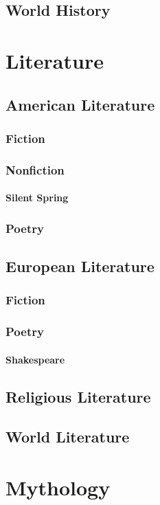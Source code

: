 \documentclass[12pt]{book}
\begin{document}
	\section{World History}
	
	
	
\chapter{Literature}
	\section{American Literature}
		\subsection{Fiction}
		\subsection{Nonfiction}
			\subsubsection{Silent Spring}
		\subsection{Poetry}

		
	\section{European Literature}
		\subsection{Fiction}
		\subsection{Poetry}
		\subsubsection{Shakespeare}
	\section{Religious Literature}
	\section{World Literature}
	
\chapter{Mythology}
\end{document}
